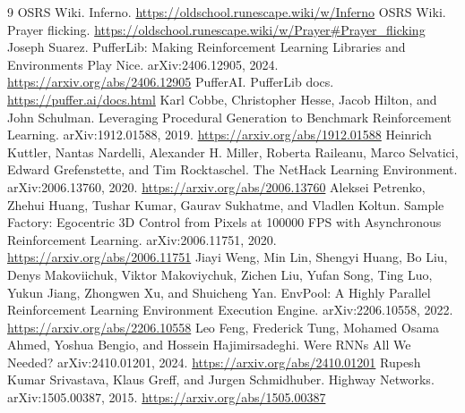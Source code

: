 \documentclass[10pt]{article}
\begin{document}
\small
\raggedright
\begin{thebibliography}{9}
 OSRS Wiki. Inferno. \url{https://oldschool.runescape.wiki/w/Inferno}
 OSRS Wiki. Prayer flicking. \url{https://oldschool.runescape.wiki/w/Prayer#Prayer_flicking}
 Joseph Suarez. PufferLib: Making Reinforcement Learning Libraries and Environments Play Nice. arXiv:2406.12905, 2024. \url{https://arxiv.org/abs/2406.12905}
 PufferAI. PufferLib docs. \url{https://puffer.ai/docs.html}
 Karl Cobbe, Christopher Hesse, Jacob Hilton, and John Schulman. Leveraging Procedural Generation to Benchmark Reinforcement Learning. arXiv:1912.01588, 2019. \url{https://arxiv.org/abs/1912.01588}
 Heinrich Kuttler, Nantas Nardelli, Alexander H. Miller, Roberta Raileanu, Marco Selvatici, Edward Grefenstette, and Tim Rocktaschel. The NetHack Learning Environment. arXiv:2006.13760, 2020. \url{https://arxiv.org/abs/2006.13760}
 Aleksei Petrenko, Zhehui Huang, Tushar Kumar, Gaurav Sukhatme, and Vladlen Koltun. Sample Factory: Egocentric 3D Control from Pixels at 100000 FPS with Asynchronous Reinforcement Learning. arXiv:2006.11751, 2020. \url{https://arxiv.org/abs/2006.11751}
 Jiayi Weng, Min Lin, Shengyi Huang, Bo Liu, Denys Makoviichuk, Viktor Makoviychuk, Zichen Liu, Yufan Song, Ting Luo, Yukun Jiang, Zhongwen Xu, and Shuicheng Yan. EnvPool: A Highly Parallel Reinforcement Learning Environment Execution Engine. arXiv:2206.10558, 2022. \url{https://arxiv.org/abs/2206.10558}
 Leo Feng, Frederick Tung, Mohamed Osama Ahmed, Yoshua Bengio, and Hossein Hajimirsadeghi. Were RNNs All We Needed? arXiv:2410.01201, 2024. \url{https://arxiv.org/abs/2410.01201}
 Rupesh Kumar Srivastava, Klaus Greff, and Jurgen Schmidhuber. Highway Networks. arXiv:1505.00387, 2015. \url{https://arxiv.org/abs/1505.00387}
\end{thebibliography}
\end{document}
